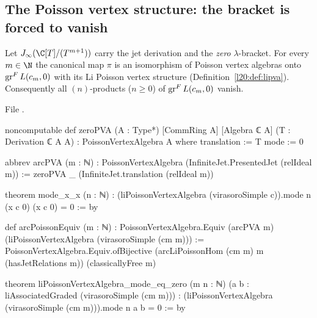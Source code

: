 \subsection{The Poisson vertex structure: the bracket is forced to vanish}

\begin{theorem}\label{l20:thm:virpva}
Let $\ltwentyJ(\C[T]/(T^{m+1}))$ carry the jet derivation and the \emph{zero} $\lambda$-bracket. For every $m\in\N$ the canonical map
$\pi$ is an isomorphism of Poisson vertex algebras onto $\operatorname{gr}^F L(c_m,0)$ with its Li Poisson vertex structure
(Definition~\ref{l20:def:lipva}). Consequently all $(n)$-products ($n\ge0$) of $\operatorname{gr}^F L(c_m,0)$ vanish.
\end{theorem}
\noindent File .
\begin{leancode}
noncomputable def zeroPVA (A : Type*) [CommRing A] [Algebra ℂ A] (T : Derivation ℂ A A) :
    PoissonVertexAlgebra A where
  translation := T
  mode := 0

abbrev arcPVA (m : ℕ) : PoissonVertexAlgebra (InfiniteJet.PresentedJet (relIdeal m)) :=
  zeroPVA _ (InfiniteJet.translation (relIdeal m))

theorem mode_x_x (n : ℕ) :
    (liPoissonVertexAlgebra (virasoroSimple c)).mode n (x c 0) (x c 0) = 0 := by

def arcPoissonEquiv (m : ℕ) :
    PoissonVertexAlgebra.Equiv (arcPVA m) (liPoissonVertexAlgebra (virasoroSimple (cm m))) :=
  PoissonVertexAlgebra.Equiv.ofBijective (arcLiPoissonHom (cm m) m (hasJetRelations m))
    (classicallyFree m)

theorem liPoissonVertexAlgebra_mode_eq_zero (m n : ℕ)
    (a b : liAssociatedGraded (virasoroSimple (cm m))) :
    (liPoissonVertexAlgebra (virasoroSimple (cm m))).mode n a b = 0 := by
\end{leancode}

